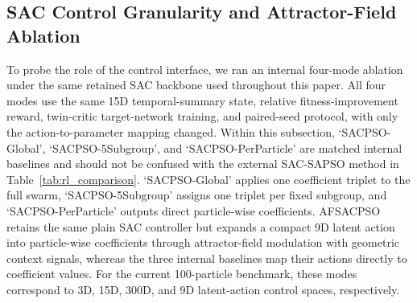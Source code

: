 \documentclass[final,5p,times]{elsarticle}
\begin{document}
\subsection{SAC Control Granularity and Attractor-Field Ablation}
\label{subsec:sac_granularity_ablation_results}
To probe the role of the control interface, we ran an internal four-mode ablation under the same retained SAC backbone used throughout this paper.
All four modes use the same 15D temporal-summary state, relative fitness-improvement reward, twin-critic target-network training, and paired-seed protocol, with only the action-to-parameter mapping changed.
Within this subsection, `SACPSO-Global', `SACPSO-5Subgroup', and `SACPSO-PerParticle' are matched internal baselines and should not be confused with the external SAC-SAPSO method in Table~\ref{tab:rl_comparison}.
`SACPSO-Global' applies one coefficient triplet to the full swarm, `SACPSO-5Subgroup' assigns one triplet per fixed subgroup, and `SACPSO-PerParticle' outputs direct particle-wise coefficients.
AFSACPSO retains the same plain SAC controller but expands a compact 9D latent action into particle-wise coefficients through attractor-field modulation with geometric context signals, whereas the three internal baselines map their actions directly to coefficient values.
For the current 100-particle benchmark, these modes correspond to 3D, 15D, 300D, and 9D latent-action control spaces, respectively.
\end{document}
